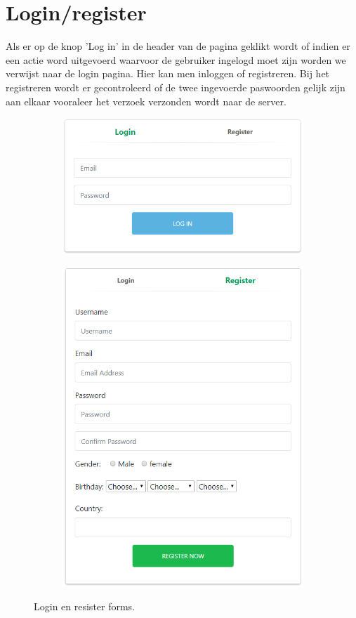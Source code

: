 \documentclass[12px]{article}
\begin{document}
\section{Login/register}
Als er op de knop 'Log in' in de header van de pagina geklikt wordt of indien er een actie word uitgevoerd waarvoor de gebruiker ingelogd moet zijn worden we verwijst naar de login pagina. Hier kan men inloggen of registreren. Bij het registreren wordt er gecontroleerd of de twee ingevoerde paswoorden gelijk zijn aan elkaar vooraleer het verzoek verzonden wordt naar de server.
\begin{figure}[!hbp]
\centering
\begin{subfigure}{.5\textwidth}
	\centering
	\includegraphics[width=.8\textwidth]{login}
\end{subfigure}%
\begin{subfigure}{.5\textwidth}
	\centering
	\includegraphics[width=.8\textwidth]{register}
\end{subfigure}
\caption{Login en resister forms.}
\end{figure}
\FloatBarrier
\end{document}
